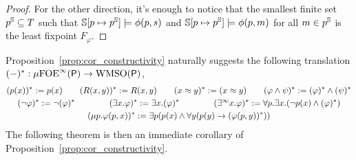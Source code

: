 \begin{proof}
For the other direction, it's enough to notice that the smallest finite set $p^{\mathbb{S}} \subseteq T$ such that $\mathbb{S}[p\mapsto p^{\mathbb{S}}] \models \phi(p,s)$ and $\mathbb{S}[p\mapsto p^{\mathbb{S}}] \models \phi(p,m)$ for all $m \in p^{\mathbb{S}}$ is the least fixpoint $F_\varphi$. %
 \end{proof}

\noindent Proposition~\ref{prop:cor_constructivity} naturally suggests the following translation $(-)^*:\mu{\ensuremath{\mathrm{FOE}}}^\infty(\mathsf{P})\to\mathrm{WMSO}(\mathsf{P})$,
\begin{gather*}
(p(x))^* \mathrel{: =} p(x) \qquad
(R(x,y))^* \mathrel{: =} R(x,y) \qquad
(x\approx y)^* \mathrel{: =}  (x \approx y) \qquad
(\varphi \land \psi)^* \mathrel{: =} (\varphi)^* \land (\psi)^* \\
(\lnot \varphi)^* \mathrel{: =}  \lnot (\varphi)^* \qquad\qquad
(\exists x. \varphi)^* \mathrel{: =}  \exists x. (\varphi)^* \qquad\qquad
(\exists^\infty x. \varphi)^* \mathrel{: =}  \forall p.\exists x. (\lnot p(x) \land (\varphi)^*) \\
(\mu p. \varphi(p,x))^* \mathrel{: =}  \exists p ( p(x) \land \forall y ( p(y) \to (\varphi(p,y) )^*))
\end{gather*}
%
The following theorem %
is then an immediate corollary of Proposition~\ref{prop:cor_constructivity}.

